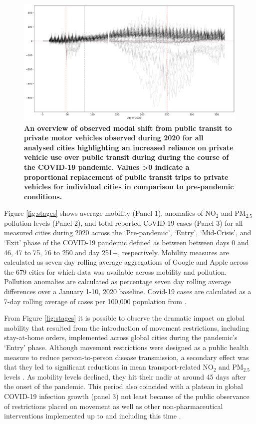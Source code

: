 \documentclass[preprint,12pt]{elsarticle}
\begin{document}
\begin{figure}
\centering
\includegraphics[trim={0 0 0 0},clip,scale=0.4]{Images/DrivingvsTransit.png}
\caption{\bf An overview of observed modal shift from public transit to private motor vehicles observed during 2020 for all analysed cities highlighting an increased reliance on private vehicle use over public transit during during the course of the COVID-19 pandemic. Values \textgreater 0 indicate a proportional replacement of public transit trips to private vehicles for individual cities in comparison to pre-pandemic conditions.}  
 \label{fig:driv_trans}
\end{figure}


Figure \ref{fig:stages} shows average mobility (Panel 1), anomalies of NO$_{2}$ and PM$_{2.5}$ pollution levels (Panel 2), and total reported CoVID-19 cases (Panel 3) for all measured cities during 2020 across the `Pre-pandemic', `Entry', `Mid-Crisis', and `Exit' phase of the COVID-19 pandemic defined as between between days 0 and 46, 47 to 75, 76 to 250 and day 251+, respectively. Mobility measures are calculated as seven day rolling average aggregations of Google and Apple across the 679 cities for which data was available across mobility and pollution. Pollution anomalies are calculated as percentage seven day rolling average differences over a January 1-10, 2020 baseline. Covid-19 cases are calculated as a 7-day rolling average of cases per 100,000 population from \cite{Google2022}.

From Figure \ref{fig:stages} it is possible to observe the dramatic impact on global mobility that resulted from the introduction of movement restrictions, including stay-at-home orders, implemented across global cities during the pandemic's `Entry' phase. Although movement restrictions were designed as a public health measure to reduce person-to-person disease transmission, a secondary effect was that they led to significant reductions in mean transport-related NO$_{2}$ and PM$_{2.5}$ levels \cite{zhang2023impact}. As mobility levels declined, they hit their nadir at around 45 days after the onset of the pandemic. This period also coincided with a plateau in global COVID-19 infection growth (panel 3) not least because of the public observance of restrictions placed on movement as well as other non-pharmaceutical interventions implemented up to and including this time \cite{hale2021global}. 
\end{document}
